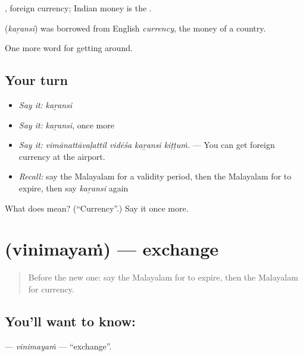  , foreign currency; Indian money is the .

\begin{cousinweb}
\textbf{} (\emph{kaṟansi}) was borrowed from English \emph{currency}, the money of a country.
\end{cousinweb}

\begin{grammarlens}[title={What you've built}]
One more word for getting around.
\end{grammarlens}

\subsection*{Your turn}
\begin{itemize}
\raggedright
  \item \emph{Say it:} \emph{kaṟansi}
  \item \emph{Say it:} \emph{kaṟansi}, once more
  \item \emph{Say it:} \emph{vimānattāvaḷattil vidēśa kaṟansi kiṭṭuṁ.} — You can get foreign currency at the airport.
  \item \emph{Recall:} say the Malayalam for a validity period, then the Malayalam for to expire, then say \emph{kaṟansi} again
\end{itemize}

\begin{tcolorbox}[breakable,colback=teal!4,colframe=teal!35!black,title={Before you move on}]
What does  mean? (\textquotedblleft{}Currency\textquotedblright{}.) Say it once more.
\end{tcolorbox}
\section[\texorpdfstring{\ml{വിനിമയം} (vinimayaṁ)}{വിനിമയം (vinimayaṁ)}]{ (vinimayaṁ) — exchange}

\label{lesson:ML-C489-vinimayam}



\begin{quote}
Before the new one: say the Malayalam for to expire, then the Malayalam for currency.
\end{quote}

\subsection*{You'll want to know: }
\textbf{} — \emph{vinimayaṁ} — \textquotedblleft{}exchange\textquotedblright{}.

